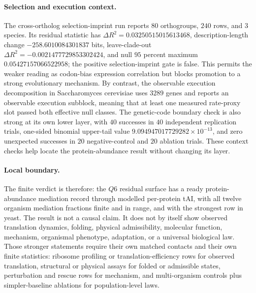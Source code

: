 \paragraph{Selection and execution context.}
The cross-ortholog selection-imprint run reports $80$ orthogroups, $240$ rows, and $3$ species.  Its residual statistic has $\Delta R^2=0.03250515015613468$, description-length change $-258.6010084301837$ bits, leave-clade-out $\Delta R^2=-0.0021477729853302424$, and null $95$ percent maximum $0.05427157066522958$; the positive selection-imprint gate is false.  This permits the weaker reading as codon-bias expression correlation but blocks promotion to a strong evolutionary mechanism.  By contrast, the observable execution decomposition in Saccharomyces cerevisiae uses $3289$ genes and reports an observable execution subblock, meaning that at least one measured rate-proxy slot passed both effective null classes.  The genetic-code boundary check is also strong at its own lower layer, with $40$ successes in $40$ independent replication trials, one-sided binomial upper-tail value $9.094947017729282\times 10^{-13}$, and zero unexpected successes in $20$ negative-control and $20$ ablation trials.  These context checks help locate the protein-abundance result without changing its layer.

\paragraph{Local boundary.}
The finite verdict is therefore: the $Q6$ residual surface has a ready protein-abundance mediation record through modelled per-protein tAI, with all twelve organism mediation fractions finite and in range, and with the strongest row in yeast.  The result is not a causal claim.  It does not by itself show observed translation dynamics, folding, physical admissibility, molecular function, mechanism, organismal phenotype, adaptation, or a universal biological law.  Those stronger statements require their own matched contacts and their own finite statistics: ribosome profiling or translation-efficiency rows for observed translation, structural or physical assays for folded or admissible states, perturbation and rescue rows for mechanism, and multi-organism controls plus simpler-baseline ablations for population-level laws.
